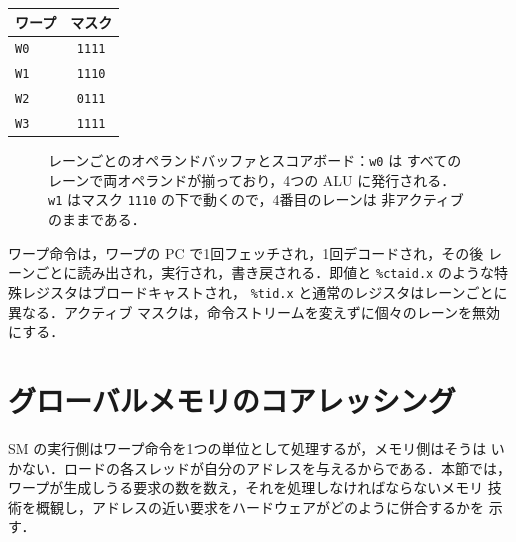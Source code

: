 \documentclass[../main.tex]{subfiles}
\begin{document}
\begin{margintable}
  \caption{後の命令のアクティブマスク（上のウォークスルーはすべての
    マスクを \texttt{1111} として実行した）．\texttt{W1} のレーン~3 と
    \texttt{W2} のレーン~0 は無効になっている．}
  \label{tab:l04-masks}
  \begin{tabular}{lc}
    \toprule
    ワープ & マスク \\
    \midrule
    \texttt{W0} & \texttt{1111} \\
    \texttt{W1} & \texttt{1110} \\
    \texttt{W2} & \texttt{0111} \\
    \texttt{W3} & \texttt{1111} \\
    \bottomrule
  \end{tabular}
\end{margintable}

\begin{figure}[htbp]
  \centering
  
  \caption{レーンごとのオペランドバッファとスコアボード：\texttt{w0} は
    すべてのレーンで両オペランドが揃っており，4つの ALU に発行される．
    \texttt{w1} はマスク \texttt{1110} の下で動くので，4番目のレーンは
    非アクティブのままである．}
  \label{fig:l04-scoreboard-lanes}
\end{figure}


\begin{keypoint}
  ワープ命令は，ワープの PC で1回フェッチされ，1回デコードされ，その後
  レーンごとに読み出され，実行され，書き戻される．即値と
  \texttt{\%ctaid.x} のような特殊レジスタはブロードキャストされ，
  \texttt{\%tid.x} と通常のレジスタはレーンごとに異なる．アクティブ
  マスクは，命令ストリームを変えずに個々のレーンを無効にする．
\end{keypoint}

\section{グローバルメモリのコアレッシング}
\label{sec:l04-coalescing}

SM の実行側はワープ命令を1つの単位として処理するが，メモリ側はそうは
いかない．ロードの各スレッドが自分のアドレスを与えるからである．本節では，
ワープが生成しうる要求の数を数え，それを処理しなければならないメモリ
技術を概観し，アドレスの近い要求をハードウェアがどのように併合するかを
示す．
\end{document}
